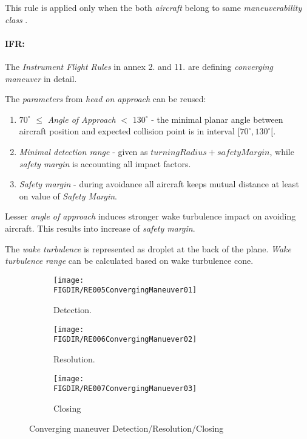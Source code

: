 \begin{note}
    This rule is applied only when the both \emph{aircraft} belong to same \emph{maneuverability class} \cite{icaoAnnex2}.
\end{note}

\paragraph{IFR:} The \emph{Instrument Flight Rules} in annex 2. \cite{icaoAnnex2} and 11. \cite{icaoAnnex11} are defining \emph{converging maneuver} in detail.

The \emph{parameters} from \emph{head on approach} can be reused:
\begin{enumerate}
    \item $70^\circ$ $\le$ \emph{Angle of Approach} $<$ $130^\circ$ - the minimal planar angle between aircraft position and expected collision point is in interval $[70^\circ , 130^\circ[$.
    
    \item\emph{Minimal detection range} - given as $turning Radius + safety Margin$, while \emph{safety margin} is accounting all impact factors. 
    
    \item\emph{Safety margin} - during avoidance all aircraft keeps mutual distance at least on value of \emph{Safety Margin}.
\end{enumerate}

\begin{note}
Lesser \emph{angle of approach} induces stronger wake turbulence impact on avoiding aircraft. This results into increase of \emph{safety margin}. 

The \emph{wake turbulence} is represented as droplet at the back of the plane. \emph{Wake turbulence range} can be calculated based on wake turbulence cone.
\end{note}

\begin{figure}[H]
	\centering
    \begin{subfigure}{0.32\textwidth}
    	\centering
        \texttt{[image: \\FIGDIR/RE005ConvergingManeuver01]} 
        \caption{Detection.}
        \label{fig:ConvergingManeuverTheoreticalDetection}
    \end{subfigure}
    \begin{subfigure}{0.32\textwidth}
        \centering
        \texttt{[image: \\FIGDIR/RE006ConvergingManuever02]} 
        \caption{Resolution.}
        \label{fig:ConvergingManeuverTheoreticalResolution}
    \end{subfigure}
    \begin{subfigure}{0.32\textwidth}
        \centering
        \texttt{[image: \\FIGDIR/RE007ConvergingManuever03]} 
        \caption{Closing}
        \label{fig:ConvergingManeuverTheoreticalClosure}
    \end{subfigure}
    \caption{Converging maneuver Detection/Resolution/Closing}
    \label{fig:ConvergingManeuverTheoretical}
\end{figure}

